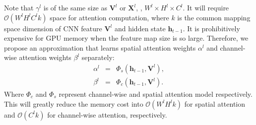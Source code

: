 \documentclass[10pt,twocolumn,letterpaper]{article}
\begin{document}
Note that $\gamma^l$ is of the same size as $\mathbf{V}^l$ or $\mathbf{X}^l$, \ie, $W^l\times H^l\times C^l$. It will require $\mathcal{O}(W^lH^lC^lk)$ space
for attention computation, where $k$ is the common mapping space dimension of CNN feature $\mathbf{V}^l$ and hidden state $\mathbf{h}_{t-1}$. It is
prohibitively expensive for GPU memory when the feature map size is so large. Therefore, we propose an approximation that learns spatial attention weights
$\alpha^l$ and channel-wise attention weights $\beta^l$ separately:
\begin{eqnarray}
\alpha^l &= & \Phi_s \left(\mathbf{h}_{t-1},\mathbf{V}^l\right),  \label{equ:spatial} \\
\beta^l &= & \Phi_c \left(\mathbf{h}_{t-1},\mathbf{V}^l\right). \label{equ:channel}
\end{eqnarray}
Where $\Phi_c$ and $\Phi_s$ represent channel-wise and spatial attention model respectively. This will greatly reduce the memory cost into
$\mathcal{O}(W^lH^lk)$ for spatial attention and $\mathcal{O}(C^lk)$ for channel-wise attention, respectively.
\end{document}

